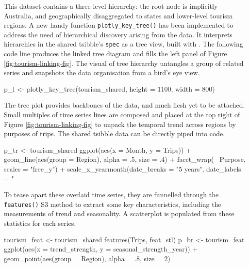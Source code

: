 This dataset contains a three-level hierarchy: the root node is
implicitly Australia, and geographically disaggregated to states and
lower-level tourism regions. A new handy function
\texttt{plotly\_key\_tree()} has been implemented to address the need of
hierarchical discovery arising from the data. It interprets hierarchies
in the shared tsibble's \texttt{spec} as a tree view, built with
. The following code line produces the linked tree
diagram and fills the left panel of Figure
\ref{fig:tourism-linking-fig}. The visual of tree hierarchy untangles a
group of related series and snapshots the data organisation from a
bird's eye view.

\begin{Schunk}
\begin{Sinput}
p_l <- plotly_key_tree(tourism_shared, height = 1100, width = 800)
\end{Sinput}
\end{Schunk}

The tree plot provides backbones of the data, and much flesh yet to be
attached. Small multiples of time series lines are composed and placed
at the top right of Figure \ref{fig:tourism-linking-fig} to unpack the
temporal trend across regions by purposes of trips. The shared tsibble
data can be directly piped into  code.

\begin{Schunk}
\begin{Sinput}
p_tr <- tourism_shared %
  ggplot(aes(x = Month, y = Trips)) +
  geom_line(aes(group = Region), alpha = .5, size = .4) +
  facet_wrap(~ Purpose, scales = "free_y") +
  scale_x_yearmonth(date_breaks = "5 years", date_labels = "%
\end{Sinput}
\end{Schunk}

To tease apart these overlaid time series, they are funnelled through
the \texttt{features()} S3 method to extract some key characteristics,
including the measurements of trend and seasonality. A scatterplot is
populated from these statistics for each series.

\begin{Schunk}
\begin{Sinput}
tourism_feat <- tourism_shared %
  features(Trips, feat_stl)
p_br <- tourism_feat %
  ggplot(aes(x = trend_strength, y = seasonal_strength_year)) +
  geom_point(aes(group = Region), alpha = .8, size = 2)
\end{Sinput}
\end{Schunk}

